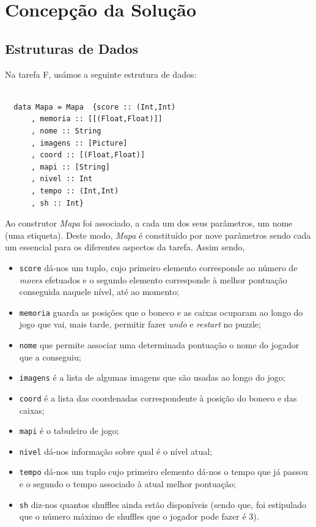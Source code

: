 \documentclass[a4paper]{article}
\begin{document}
\section{Concepção da Solução}
\label{sec:solucao}

\subsection{Estruturas de Dados}

Na tarefa F, usámos a seguinte estrutura de dados:
\begin{Verbatim}

  data Mapa = Mapa  {score :: (Int,Int)
      , memoria :: [[(Float,Float)]]
      , nome :: String
      , imagens :: [Picture]
      , coord :: [(Float,Float)]
      , mapi :: [String]
      , nivel :: Int
      , tempo :: (Int,Int)
      , sh :: Int} 

\end{Verbatim}


Ao construtor \emph{Mapa} foi associado, a cada um dos seus parâmetros, um nome (uma etiqueta). Deste modo, \emph{Mapa} é constituído por nove parâmetros sendo cada um essencial para os diferentes aspectos da tarefa. Assim sendo,

\begin{itemize}
\item \texttt{score} dá-nos um tuplo, cujo primeiro elemento corresponde ao número de \emph{moves} efetuados e o segundo elemento corresponde à melhor pontuação conseguida naquele nível, até ao momento;
\item \texttt{memoria} guarda as posições que o boneco e as caixas ocuparam ao longo do jogo que vai, mais tarde, permitir fazer \emph{undo} e \emph{restart} no puzzle;
\item \texttt{nome} que permite associar uma determinada pontuação o nome do jogador que a conseguiu;
\item \texttt{imagens} é a lista de algumas imagens que são usadas ao longo do jogo;
\item \texttt{coord} é a lista das coordenadas correspondente à posição do boneco e das caixas;
\item \texttt{mapi} é o tabuleiro de jogo;
\item \texttt{nivel} dá-nos informação sobre qual é o nível atual;
\item \texttt{tempo} dá-nos um tuplo cujo primeiro elemento dá-nos o tempo que já passou e o segundo o tempo associado à atual melhor pontuação;
\item \texttt{sh} diz-nos quantos shuffles ainda estão disponíveis (sendo que, foi estipulado que o número máximo de shuffles que o jogador pode fazer é 3).
\end{itemize}
\end{document}
